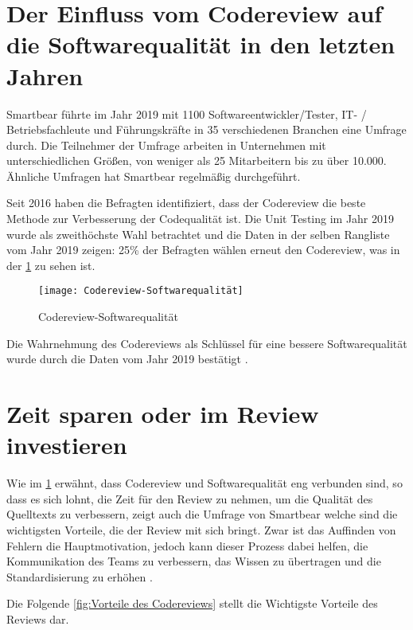 \section{Der Einfluss vom Codereview auf die Softwarequalität in den letzten Jahren}
\label{sec:Einfluss des Reviews}
Smartbear \cite{smartbear} führte im Jahr 2019 mit 1100 Softwareentwickler/Tester, IT- / Betriebsfachleute und Führungskräfte in 35 verschiedenen Branchen eine Umfrage durch. Die Teilnehmer der Umfrage arbeiten in Unternehmen mit unterschiedlichen Größen, von weniger als 25 Mitarbeitern bis zu über 10.000. Ähnliche Umfragen hat Smartbear regelmäßig durchgeführt.

Seit 2016 haben die Befragten identifiziert, dass der Codereview die beste Methode zur Verbesserung der Codequalität ist. Die Unit Testing im Jahr 2019 wurde als zweithöchste Wahl betrachtet und die Daten in der selben Rangliste vom Jahr 2019 zeigen: 25\% der Befragten wählen erneut den Codereview, was in der \cref{fig:Codereview-Softwarequalität} zu sehen ist.

\begin{figure}[H]
	\centering
	\texttt{[image: Codereview-Softwarequalität]}
	\caption[Einfluss der Codereview auf die Softwarequalität]{Codereview-Softwarequalität\\ \cite{smartbear}}
	\label{fig:Codereview-Softwarequalität}
\end{figure}

Die Wahrnehmung des Codereviews als Schlüssel für eine bessere Softwarequalität wurde durch die Daten vom Jahr 2019 bestätigt \cite{smartbear}.


\section{Zeit sparen oder im Review investieren}
\label{sec:reviewZeit}

Wie im \cref{sec:Einfluss des Reviews} erwähnt, dass Codereview und Softwarequalität eng verbunden sind, so dass es sich lohnt, die Zeit für den Review zu nehmen, um die Qualität des Quelltexts zu verbessern, zeigt auch die Umfrage von Smartbear welche sind die wichtigsten Vorteile, die der Review mit sich bringt. Zwar ist das Auffinden von Fehlern die Hauptmotivation, jedoch kann dieser Prozess dabei helfen, die Kommunikation des Teams zu verbessern, das Wissen zu übertragen und die Standardisierung zu erhöhen \cite{smartbear}. 

Die Folgende \cref{fig:Vorteile des Codereviews} stellt die Wichtigste Vorteile des Reviews dar.

